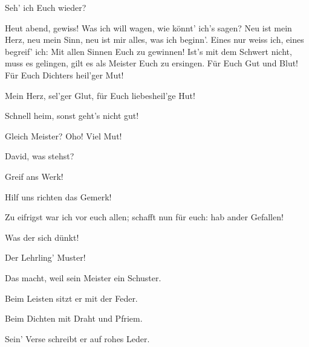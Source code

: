 \begin{drama}


\Evaspeaks
{}

Seh' ich Euch wieder?

\Waltherspeaks
{}

Heut abend, gewiss!
Was ich will wagen, wie könnt' ich's sagen?
Neu ist mein Herz, neu mein Sinn,
neu ist mir alles, was ich beginn'.
Eines nur weiss ich, eines begreif' ich:
Mit allen Sinnen Euch zu gewinnen!
Ist's mit dem Schwert nicht, muss es gelingen,
gilt es als Meister Euch zu ersingen.
Für Euch Gut und Blut!
Für Euch Dichters heil'ger Mut!

\Evaspeaks


Mein Herz, sel'ger Glut,
für Euch liebesheil'ge Hut!

\Magdalenespeaks
Schnell heim, sonst geht's nicht gut!

\Davidspeaks
{}

Gleich Meister? Oho! Viel Mut!




\scene


David, was stehst?

Greif ans Werk!

Hilf uns richten das Gemerk!

\Davidspeaks
Zu eifrigst war ich vor euch allen;
schafft nun für euch:
hab ander Gefallen!

Was der sich dünkt!

Der Lehrling' Muster!

Das macht, weil sein Meister ein Schuster.

Beim Leisten sitzt er mit der Feder.

Beim Dichten mit Draht und Pfriem.

Sein' Verse schreibt er auf rohes Leder.


\end{drama}
